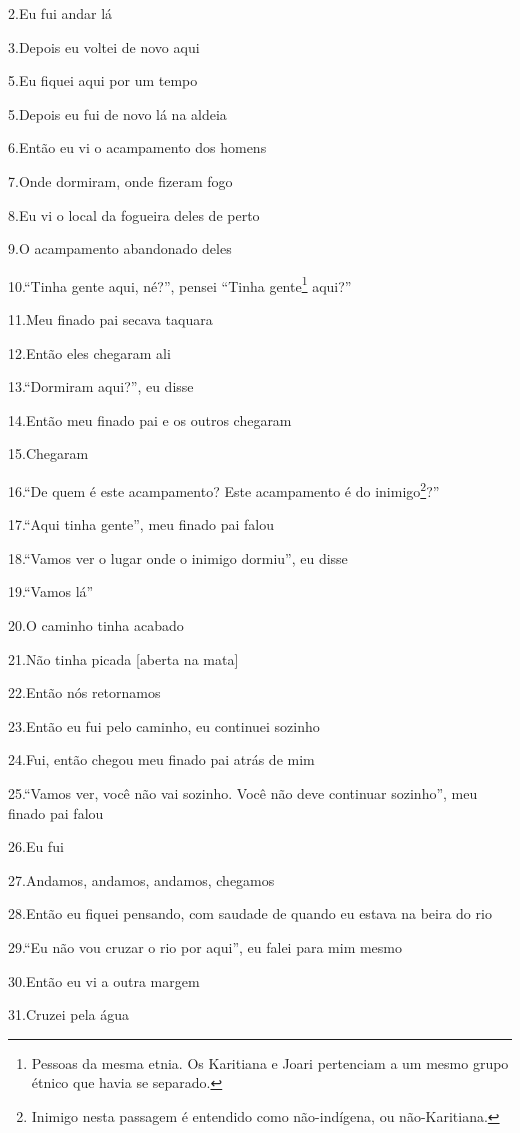 2.Eu fui andar lá

3.Depois eu voltei de novo aqui

5.Eu fiquei aqui por um tempo

5.Depois eu fui de novo lá na aldeia

6.Então eu vi o acampamento dos homens

7.Onde dormiram, onde fizeram fogo

8.Eu vi o local da fogueira deles de perto

9.O acampamento abandonado deles

10.``Tinha gente aqui, né?'', pensei ``Tinha gente\footnote{Pessoas da
  mesma etnia. Os Karitiana e Joari pertenciam a um mesmo grupo étnico
  que havia se separado.} aqui?''

11.Meu finado pai secava taquara

12.Então eles chegaram ali

13.``Dormiram aqui?'', eu disse

14.Então meu finado pai e os outros chegaram

15.Chegaram

16.``De quem é este acampamento? Este acampamento é do inimigo\footnote{Inimigo
  nesta passagem é entendido como não-indígena, ou não-Karitiana.}?''

17.``Aqui tinha gente'', meu finado pai falou

18.``Vamos ver o lugar onde o inimigo dormiu'', eu disse

19.``Vamos lá''

20.O caminho tinha acabado

21.Não tinha picada {[}aberta na mata{]}

22.Então nós retornamos

23.Então eu fui pelo caminho, eu continuei sozinho

24.Fui, então chegou meu finado pai atrás de mim

25.``Vamos ver, você não vai sozinho. Você não deve continuar sozinho'',
meu finado pai falou

26.Eu fui

27.Andamos, andamos, andamos, chegamos

28.Então eu fiquei pensando, com saudade de quando eu estava na beira do
rio

29.``Eu não vou cruzar o rio por aqui'', eu falei para mim mesmo

30.Então eu vi a outra margem

31.Cruzei pela água

